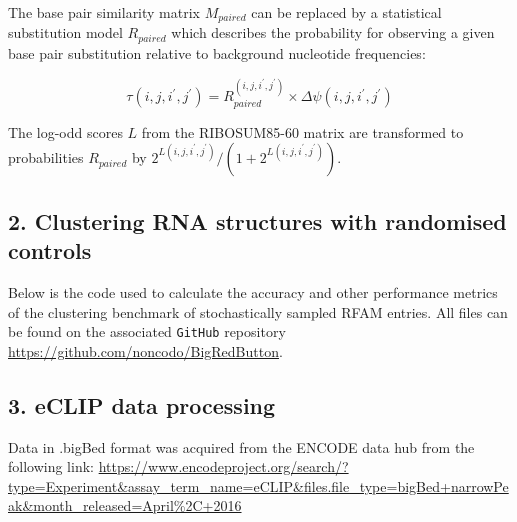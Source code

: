 \documentclass{bmcart}
\begin{document}
\noindent The base pair similarity matrix
$M_{paired}$ can be replaced by a statistical substitution model $R_{paired}$
which describes the probability for observing a given base pair substitution
relative to background nucleotide frequencies:

\begin{equation}\label{eq10}
	\tau(i,j,i^\prime,j^\prime) = R_{paired}^{(i,j,i^\prime,j^\prime)}
\times \Delta \psi(i,j,i^\prime,j^\prime)
\end{equation}

\noindent The log-odd scores $L$ from the RIBOSUM85-60 matrix \cite{Klein14499004}
	are transformed to probabilities $R_{paired}$ by $2^{L(i,j,i^\prime,j^\prime)} / (1 + 2^{L(i,j,i^\prime,j^\prime)})$.\\


\subsection*{ 2. Clustering RNA structures with randomised controls }

Below is the code used to calculate the accuracy and other performance metrics of 
the clustering benchmark of stochastically sampled RFAM entries. All files can be found on the 
associated \texttt{GitHub} repository \url{https://github.com/noncodo/BigRedButton}.




\subsection*{ 3. eCLIP data processing }
Data in .bigBed format was acquired from the ENCODE data hub from the following link:
\url{https://www.encodeproject.org/search/?type=Experiment&assay_term_name=eCLIP&files.file_type=bigBed+narrowPeak&month_released=April\%2C+2016}
\end{document}
